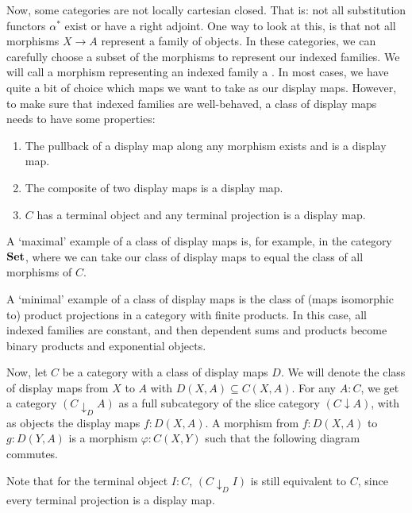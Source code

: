 Now, some categories are not locally cartesian closed. That is: not all substitution functors $ \alpha^* $ exist or have a right adjoint. One way to look at this, is that not all morphisms $ X \to A $ represent a family of objects. In these categories, we can carefully choose a subset of the morphisms to represent our indexed families. We will call a morphism representing an indexed family a . In most cases, we have quite a bit of choice which maps we want to take as our display maps. However, to make sure that indexed families are well-behaved, a class of display maps needs to have some properties:
\begin{enumerate}
  \item The pullback of a display map along any morphism exists and is a display map.
  \item The composite of two display maps is a display map.
  \item $ C $ has a terminal object and any terminal projection is a display map.
\end{enumerate}
\begin{remark}
  A `maximal' example of a class of display maps is, for example, in the category $ \mathbf{Set} $, where we can take our class of display maps to equal the class of all morphisms of $ C $.
\end{remark}
\begin{remark}
  A `minimal' example of a class of display maps is the class of (maps isomorphic to) product projections in a category with finite products. In this case, all indexed families are constant, and then dependent sums and products become binary products and exponential objects.
\end{remark}

Now, let $ C $ be a category with a class of display maps $ D $. We will denote the class of display maps from $ X $ to $ A $ with $ D(X, A) \subseteq C(X, A) $. For any $ A : C $, we get a category $ (C \downarrow_D A) $ as a full subcategory of the slice category $ (C \downarrow A) $, with as objects the display maps $ f: D(X, A) $. A morphism from $ f: D(X, A) $ to $ g: D(Y, A) $ is a morphism $ \varphi: C(X, Y) $ such that the following diagram commutes.
\begin{center}
\end{center}
Note that for the terminal object $ I : C $, $ (C \downarrow_D I) $ is still equivalent to $ C $, since every terminal projection is a display map.

